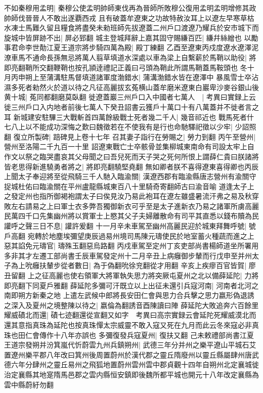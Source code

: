 不如秦穆用孟明|{
	秦穆公使孟明帥師東伐再為晉師所敗穆公復用孟明孟明增修其政帥師伐晉晉人不敢出遂覇西戎}
且有破蓋牟遼東之功故特赦汝耳上以遼左早寒草枯水凍士馬難久留且糧食將盡癸未勑班師先拔遼蓋二州戶口渡遼乃耀兵於安市城下而旋城中皆屏跡不出|{
	屏必郅翻}
城主登城拜辭上嘉其固守賜縑百匹|{
	縑幷絲繒也}
以勵事君命李世勣江夏王道宗將步騎四萬為殿|{
	殿丁練翻}
乙酉至遼東丙戍度遼水遼澤泥潦車馬不通命長孫無忌將萬人翦草填道水深處以車為梁上自繫薪於馬鞘以助役|{
	將即亮翻鞘所交翻鞭鞘也按孔頴逹禮記正義曰弓頭為鞘此所謂馬鞘蓋馬鞍頭也}
冬十月丙申朔上至蒲溝駐馬督填道諸軍度渤錯水|{
	蒲溝渤錯水皆在遼澤中}
暴風雪士卒沾濕多死者勑然火於道以待之凡征高麗拔玄菟横山蓋牟磨米遼東白巖卑沙麥谷銀山後黄十城|{
	菟同都翻磨莫臥翻}
徙遼蓋巖三州戶口入中國者七萬人　|{
	考異曰實録上云徙三州戶口入内地者前後七萬人下癸丑詔書云獲戶十萬口十有八萬蓋并不徙者言之耳}
新城建安駐驆三大戰斬首四萬餘級戰士死者幾二千人|{
	幾音祁近也}
戰馬死者什七八上以不能成功深悔之歎曰魏徵若在不使我有是行也命馳驛祀徵以少牢|{
	少詔照翻}
復立所製碑|{
	踣碑見上卷十七年}
召其妻子詣行在勞賜之|{
	勞力到翻}
丙午至營州|{
	營州至洛陽二千九百一十里}
詔遼東戰亡士卒骸骨並集柳城東南命有司設太牢上自作文以祭之臨哭盡哀其父母聞之曰吾兒死而天子哭之死何所恨上謂薛仁貴曰朕諸將皆老思得新進驍勇者將之|{
	將即亮翻驍堅堯翻}
無如卿者朕不喜得遼東喜得卿也丙辰上聞太子奉迎將至從飛騎三千人馳入臨渝關|{
	漢遼西郡有臨渝縣唐志營州有渝關守捉城杜佑曰臨渝關在平州盧龍縣城東百八十里騎奇寄翻師古曰渝音喻}
道逢太子上之發定州也指所御褐袍謂太子曰俟見汝乃易此袍耳在遼左雖盛暑流汗弗之易及秋穿敗左右請易之上曰軍士衣多弊吾獨御新衣可乎至是太子進新衣乃易之諸軍所虜高麗民萬四千口先集幽州將以賞軍士上愍其父子夫婦離散命有司平其直悉以錢布贖為民讙呼之聲三日不息|{
	讙許爰翻}
十一月辛未車駕至幽州高麗民迎於城東拜舞呼號|{
	號戶高翻}
宛轉於地塵埃彌望庚辰過易州境司馬陳元璹使民於地室蓄火種蔬而進之上惡其諂免元璹官|{
	璹殊玉翻惡烏路翻}
丙戍車駕至定州丁亥吏部尚書楊師道坐所署用多非其才左遷工部尚書壬辰車駕發定州十二月辛丑上病癰御步輦而行戊申至并州太子為上吮癰扶輦步從者數日|{
	為于偽翻吮徐兖翻從才用翻}
辛亥上疾瘳百官皆賀|{
	廖丑留翻}
上之征高麗也使右領軍大將軍執失思力將突厥屯夏州之北以備薛延陀|{
	力將即亮翻下同夏戶雅翻}
薛延陀多彌可汗既立以上出征未還引兵寇河南|{
	河南者北河之南即朔方新秦之地}
上遣左武候中郎將長安田仁會與思力合兵擊之思力嬴形偽退誘之深入及夏州之境整陳以待之|{
	嬴倫為翻誘音酉陳讀曰陣}
薛延陀大敗追奔六百餘里耀威磧北而還|{
	磧七迹翻還從宣翻又如字　考異曰高宗實録云會延陀死耀威漠北而還其意指真珠為延陀也按真珠憚太宗威靈不敢入寇又死在九月而此云冬來寇必非真珠也田仁會傳作十八年亦誤也}
多彌復發兵寇夏州|{
	復扶又翻}
己未敕禮部尚書江夏王道宗發朔并汾箕嵐代忻蔚雲九州兵鎮朔州|{
	武德三年分并州之樂平遼山平城石艾置遼州樂平郡八年改曰箕州後周置蔚州於漢代郡之靈丘隋廢州以靈丘縣屬肆州唐武德六年分肆州之靈丘易州之飛狐地置蔚州雲州雲中郡貞觀十四年自朔州北定襄城徙治定襄縣其地寔隋馬邑郡之雲内縣恒安鎮即後魏所都平城也開元十八年改定襄縣為雲中縣蔚紆勿翻}
